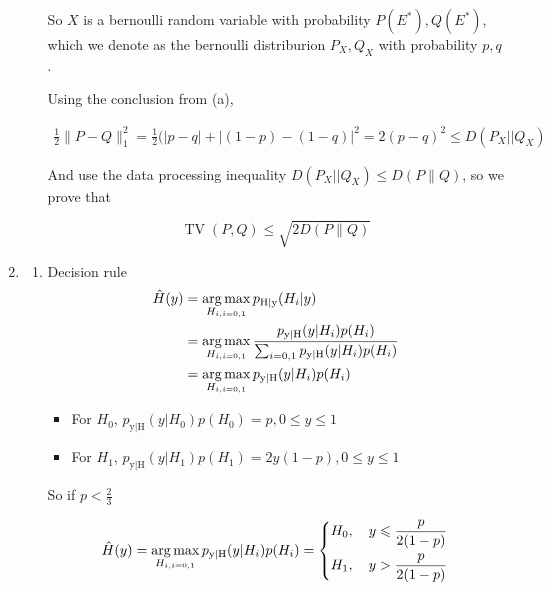 \documentclass[a4paper]{article}
\begin{document}
\begin{enumerate}
\begin{enumerate}
  So $X$ is a bernoulli random variable with probability $P(E^*),Q(E^*)$, which we denote as the bernoulli distriburion $P_X,Q_X$ with probability $p,q$.

  Using the conclusion from (a), 

  \begin{equation}
    \begin{aligned}
      \frac 1 2 \|P-Q \|^2_1 = \frac{1}{2} (|p-q|+|(1-p)-(1-q)|^2 = 2(p-q)^2 \leqslant  D(P_X||Q_X)
    \end{aligned}
  \end{equation}
  

  And use the data processing inequality $D(P_X||Q_X) \leqslant D(P\| Q)$, so we prove that 

  \begin{equation}
    \operatorname{TV}(P, Q) \leqslant \sqrt{{2} D(P \| Q)} 
  \end{equation}

\end{enumerate}

\item \begin{enumerate} %
  \item Decision rule
  \begin{equation}
    \begin{aligned}
      \hat H(y) & = \operatorname*{arg\,max}_{H_{i,i=0,1}} p_{\mathrm{H}| \mathrm{y}}(H_i|y) \\
      & = \operatorname*{arg\,max}_{H_{i,i=0,1}} \frac {p_{\mathrm{y} | \mathrm{H}}(y| H_i)p(H_i)}{\sum_{i=0,1} p_{\mathrm{y} | \mathrm{H}}(y| H_i)p(H_i)} \\ 
      & = \operatorname*{arg\,max}_{H_{i,i=0,1}} p_{\mathrm{y} | \mathrm{H}}(y| H_i)p(H_i)
    \end{aligned}
  \end{equation}

  \begin{itemize}
    \item For $H_0$, $p_{\mathrm{y} | \mathrm{H}}(y| H_0)p(H_0) = p,0\leqslant y \leqslant 1$
    \item For $H_1$, $p_{\mathrm{y} | \mathrm{H}}(y| H_1)p(H_1) = 2y(1-p),0\leqslant y \leqslant 1$
  \end{itemize}

  So  if $p <\frac {2}{3}$

  \begin{equation}
    \hat H(y) = \operatorname*{arg\,max}_{H_{i,i=0,1}} p_{\mathrm{y} | \mathrm{H}}(y| H_i)p(H_i) = \left\{ \begin{aligned}
      H_0, \quad y \leqslant \frac{p}{2(1-p)} \\
      H_1, \quad y >  \frac{p}{2(1-p)}
    \end{aligned}\right.
  \end{equation}


\end{enumerate}
\end{enumerate}
\end{document}
